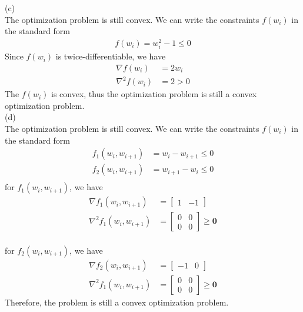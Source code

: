 \documentclass[twoside,11pt]{homework}
\begin{document}
(c) \\
\indent
The optimization problem is still convex. We can write the constraints $f(w_i)$ in the standard form \\
\begin{align*}
f(w_i) = w_i^2 - 1 \leq 0
\end{align*}
Since $f(w_i) $ is twice-differentiable, we have
\\
\begin{align*}
\nabla f(w_i) &= 2w_i \\
\nabla^2 f(w_i) &= 2 > 0
\end{align*}
The $f(w_i)$ is convex, thus the optimization problem is still a convex optimization problem. 
\\

(d) \\
\indent
The optimization problem is still convex. We can write the constraints $f(w_i)$ in the standard form\\
\begin{align*}
f_1(w_i, w_{i+1} )  &= w_i - w_{i+1} \leq 0\\
f_2(w_i, w_{i+1} )  &= w_{i+1} - w_i \leq 0\\ 
\end{align*}
for $f_1(w_i, w_{i+1} )$, we have \\

\begin{align*}
\nabla f_1(w_i, w_{i+1} )  &=\begin{bmatrix}
  1 & -1 
 \end{bmatrix}\\
\nabla^2 f_1(w_i, w_{i+1} )  &=
\begin{bmatrix}
  0 & 0 \\
  0 & 0
 \end{bmatrix}
\geq \pmb 0
\end{align*}
\\
for $f_2(w_i, w_{i+1} )$, we have \\
\begin{align*}
\nabla f_2(w_i, w_{i+1} )  &= \begin{bmatrix}
  -1 & 0 
 \end{bmatrix}\\
\nabla^2 f_1(w_i, w_{i+1} )  &=
\begin{bmatrix}
  0 & 0 \\
  0 & 0
 \end{bmatrix}
\geq \pmb 0
\end{align*}
Therefore, the problem is still a convex optimization problem.
\end{document}
